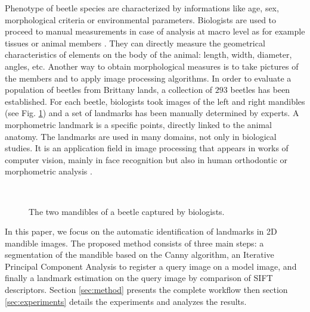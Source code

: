 \documentclass[twoside,twocolumn,10pt]{article}
\begin{document}
\copyrightspace
 Phenotype of beetle species are characterized by informations like age, sex, morphological criteria or environmental parameters.
 Biologists are used to proceed to manual measurements in case of analysis at macro level as for example tissues or animal members \cite{houle2003automated} \cite{bromiley2014semi}.
 They can directly measure the geometrical characteristics of elements on the body of the animal: length, width, diameter, angles, etc.
 Another way to obtain morphological measures is to take pictures of the members and to apply image processing algorithms.
 In order to evaluate a population of beetles from Brittany lands, a collection of $293$ beetles has been established.
 For each beetle, biologists took images of the left and right mandibles (see Fig. \ref{figparts}) and a set of landmarks has been manually determined by experts.
 A morphometric landmark is a specific points, directly linked to the animal anatomy.
 The landmarks are used in many domains, not only in biological studies.
 It is an application field in image processing \cite{li09} that appears in works of computer vision, mainly in face recognition \cite{zhang2014facial} but also in human orthodontic \cite{favaedi2010cephalometric} or morphometric
 analysis \cite{bec03}.

\begin{figure}[htbp]
\centering
{}~~
\caption{The two mandibles of a beetle captured by biologists.}
\label{figparts}
\end{figure}

In this paper, we focus on the automatic identification of landmarks in 2D mandible images.
The proposed method consists of three main steps: a segmentation of the mandible based on the Canny algorithm, an Iterative Principal
Component Analysis to register a query image on a model image, and finally a landmark estimation on the query image by comparison of SIFT descriptors.
Section \ref{sec:method} presents the complete workflow then section \ref{sec:experiments} details the experiments and analyzes the results.
\end{document}
